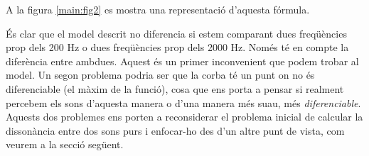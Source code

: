 \documentclass{article}
\theoremstyle{definition}
\begin{document}
A la figura \ref{main:fig2} es mostra una representació d'aquesta fórmula.
\begin{center}
    
    \label{main:fig2}
\end{center}
És clar que el model descrit no diferencia si estem comparant dues freqüències prop dels 200 Hz o dues freqüències prop dels 2000 Hz. Només té en compte la diferència entre ambdues. Aquest és un primer inconvenient que podem trobar al model. Un segon problema podria ser que la corba té un punt on no és diferenciable (el màxim de la funció), cosa que ens porta a pensar si realment percebem els sons d'aquesta manera o d'una manera més suau, més \textit{diferenciable}. Aquests dos problemes ens porten a reconsiderar el problema inicial de calcular la dissonància entre dos sons purs i enfocar-ho des d'un altre punt de vista, com veurem a la secció següent.
\end{document}
